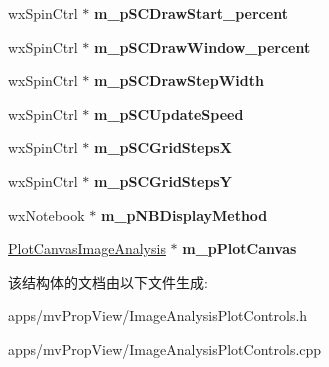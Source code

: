 \begin{DoxyCompactItemize}
\item 
\hypertarget{struct_image_analysis_plot_controls_af9db3c997c3a716be6fbceece566a725}{wx\+Spin\+Ctrl $\ast$ {\bfseries m\+\_\+p\+S\+C\+Draw\+Start\+\_\+percent}}\label{struct_image_analysis_plot_controls_af9db3c997c3a716be6fbceece566a725}

\item 
\hypertarget{struct_image_analysis_plot_controls_a0ea7a07cb36afa8434a296ee8a9ef70d}{wx\+Spin\+Ctrl $\ast$ {\bfseries m\+\_\+p\+S\+C\+Draw\+Window\+\_\+percent}}\label{struct_image_analysis_plot_controls_a0ea7a07cb36afa8434a296ee8a9ef70d}

\item 
\hypertarget{struct_image_analysis_plot_controls_ac6da6a573ef16289ac8931df994e668b}{wx\+Spin\+Ctrl $\ast$ {\bfseries m\+\_\+p\+S\+C\+Draw\+Step\+Width}}\label{struct_image_analysis_plot_controls_ac6da6a573ef16289ac8931df994e668b}

\item 
\hypertarget{struct_image_analysis_plot_controls_a13410c596e8e7456f279dd4a8c5f3a20}{wx\+Spin\+Ctrl $\ast$ {\bfseries m\+\_\+p\+S\+C\+Update\+Speed}}\label{struct_image_analysis_plot_controls_a13410c596e8e7456f279dd4a8c5f3a20}

\item 
\hypertarget{struct_image_analysis_plot_controls_a7a331cfc03cea7adf0ff3248406ec6b2}{wx\+Spin\+Ctrl $\ast$ {\bfseries m\+\_\+p\+S\+C\+Grid\+Steps\+X}}\label{struct_image_analysis_plot_controls_a7a331cfc03cea7adf0ff3248406ec6b2}

\item 
\hypertarget{struct_image_analysis_plot_controls_a1013c82f1802bf91d564f68e67a32293}{wx\+Spin\+Ctrl $\ast$ {\bfseries m\+\_\+p\+S\+C\+Grid\+Steps\+Y}}\label{struct_image_analysis_plot_controls_a1013c82f1802bf91d564f68e67a32293}

\item 
\hypertarget{struct_image_analysis_plot_controls_acd48f271df1a829001b7d4f61aa490a3}{wx\+Notebook $\ast$ {\bfseries m\+\_\+p\+N\+B\+Display\+Method}}\label{struct_image_analysis_plot_controls_acd48f271df1a829001b7d4f61aa490a3}

\item 
\hypertarget{struct_image_analysis_plot_controls_a48b020c99e544829fe99c4c7741d47ad}{\hyperlink{class_plot_canvas_image_analysis}{Plot\+Canvas\+Image\+Analysis} $\ast$ {\bfseries m\+\_\+p\+Plot\+Canvas}}\label{struct_image_analysis_plot_controls_a48b020c99e544829fe99c4c7741d47ad}

\end{DoxyCompactItemize}


该结构体的文档由以下文件生成\+:\begin{DoxyCompactItemize}
\item 
apps/mv\+Prop\+View/Image\+Analysis\+Plot\+Controls.\+h\item 
apps/mv\+Prop\+View/Image\+Analysis\+Plot\+Controls.\+cpp\end{DoxyCompactItemize}
